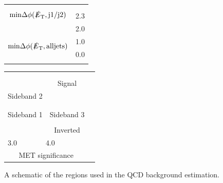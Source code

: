 \begin{figure}[h!]
\begin{center}
  \begin{tabular}{c r}
    &   \\
    \multirow{4}{*}{$\mathrm{min}\Delta\phi(\slashed{E}_{\mathrm{T}},\mathrm{j1/j2})$} & \\
    & \multirow{2}{*}{2.3} \\
    &  \\
    & \multirow{2}{*}{2.0}  \\
    & \\
    & \multirow{2}{*}{1.0}\\
    \multirow{2}{*}{$\mathrm{min}\Delta\phi(\slashed{E}_{\mathrm{T}},\mathrm{all jets})$} & \\
    & \multirow{2}{*}{0.0}\\
    & \\
    & \\
  \end{tabular}
  \begin{tabular}{c c c | c c c c}
\multicolumn{7}{|c}{}\\
\multicolumn{3}{|c|}{{\cellcolor{cyan}}} & \multicolumn{3}{|c}{\cellcolor{green}} & \\
\multicolumn{3}{|c|}{{\cellcolor{cyan}}} & \multicolumn{3}{|c}{\multirow{-2}{*}{\cellcolor{green}Signal}}  & \multirow{4}{*}{} \\
\cline{4-7}
\multicolumn{3}{|c|}{\multirow{-2}{*}{{\cellcolor{cyan}} Sideband 2}} & \multicolumn{3}{|c}{} & \\
\multicolumn{3}{|c|}{\multirow{-2}{*}{{\cellcolor{cyan}}}} & \multicolumn{3}{|c}{} & \\
\hline
\multicolumn{3}{|c|}{{\cellcolor{cyan}}} & \multicolumn{3}{|c}{\cellcolor{cyan}} & \\
\multicolumn{3}{|c|}{\multirow{-2}{*}{{\cellcolor{cyan}}Sideband 1}} & \multicolumn{3}{|c}{\multirow{-2}{*}{\cellcolor{cyan}Sideband 3}} & \\
\hline
\hline
\multicolumn{3}{|c|}{} & \multicolumn{3}{|c}{\cellcolor{orange}} & \\
\multicolumn{3}{|c|}{} & \multicolumn{3}{|c}{\multirow{-2}{*}{\cellcolor{orange}Inverted}} & \multirow{-2}{*}{} \\
\hline
\multicolumn{2}{l}{\hspace{-.4cm}3.0}  & \multicolumn{2}{c}{\hspace{.9cm}4.0} &  & \multicolumn{2}{c}{} \\
\multicolumn{6}{c}{MET significance} & \\
\end{tabular}
\end{center}
\caption{A schematic of the regions used in the QCD background estimation.}
\label{fig:parkedqcdregions}
\end{figure}


